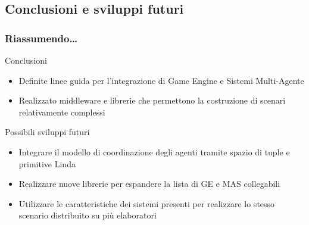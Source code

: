 \documentclass[handout]{beamer}\mode<presentation>{\usetheme{AMSCesenaBleu}}
\begin{document}
\subsection{Conclusioni e sviluppi futuri}

\begin{frame}
\frametitle[Conclusioni e sviluppi futuri]{Riassumendo\ldots}

	\begin{block}{Conclusioni}
		\begin{itemize}
         \item Definite linee guida per l'integrazione di Game Engine e Sistemi Multi-Agente
         \item Realizzato middleware e librerie che permettono la costruzione di scenari relativamente complessi
		\end{itemize}
	\end{block}

	\begin{block}{Possibili sviluppi futuri}
		\begin{itemize}
         \item Integrare il modello di coordinazione degli agenti tramite spazio di tuple e primitive Linda
         \item Realizzare nuove librerie per espandere la lista di GE e MAS collegabili
         \item Utilizzare le caratteristiche dei sistemi presenti per realizzare lo stesso scenario distribuito su più elaboratori
		\end{itemize}
	\end{block}

\end{frame}

\maketitle
\end{document}
